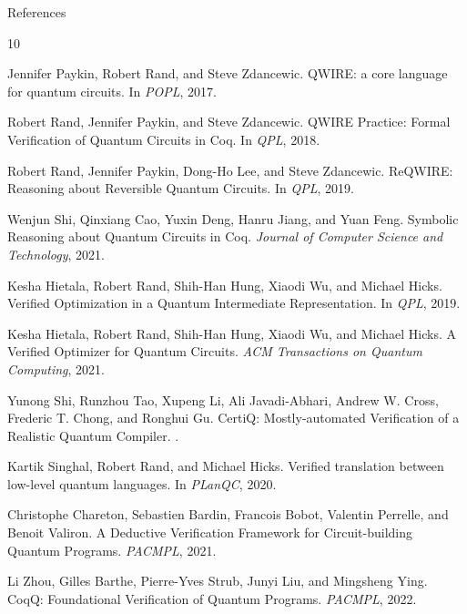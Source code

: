 \documentclass[aspectratio=169]{beamer}
\begin{document}
\begin{frame}[allowframebreaks]{References}
\footnotesize
\begin{thebibliography}{10}

Jennifer Paykin, Robert Rand, and Steve Zdancewic.
\newblock QWIRE: a core language for quantum circuits.
\newblock In \emph{POPL}, 2017.

Robert Rand, Jennifer Paykin, and Steve Zdancewic.
\newblock QWIRE Practice: Formal Verification of Quantum Circuits in Coq.
\newblock In \emph{QPL}, 2018.

Robert Rand, Jennifer Paykin, Dong-Ho Lee, and Steve Zdancewic.
\newblock ReQWIRE: Reasoning about Reversible Quantum Circuits.
\newblock In \emph{QPL}, 2019.

Wenjun Shi, Qinxiang Cao, Yuxin Deng, Hanru Jiang, and Yuan Feng.
\newblock Symbolic Reasoning about Quantum Circuits in Coq.
\newblock \emph{Journal of Computer Science and Technology}, 2021.

Kesha Hietala, Robert Rand, Shih-Han Hung, Xiaodi Wu, and Michael Hicks.
\newblock Verified Optimization in a Quantum Intermediate Representation.
\newblock In \emph{QPL}, 2019.

Kesha Hietala, Robert Rand, Shih-Han Hung, Xiaodi Wu, and Michael Hicks.
\newblock A Verified Optimizer for Quantum Circuits.
\newblock \emph{ACM Transactions on Quantum Computing}, 2021.

Yunong Shi, Runzhou Tao, Xupeng Li, Ali Javadi-Abhari, Andrew W. Cross, Frederic T. Chong, and Ronghui Gu.
\newblock CertiQ: Mostly-automated Verification of a Realistic Quantum Compiler.
.

Kartik Singhal, Robert Rand, and Michael Hicks.
\newblock Verified translation between low-level quantum languages.
\newblock In \emph{PLanQC}, 2020.

Christophe Chareton, Sebastien Bardin, Francois Bobot, Valentin Perrelle, and Benoit Valiron.
\newblock A Deductive Verification Framework for Circuit-building Quantum Programs.
\newblock \emph{PACMPL}, 2021.

Li Zhou, Gilles Barthe, Pierre-Yves Strub, Junyi Liu, and Mingsheng Ying.
\newblock CoqQ: Foundational Verification of Quantum Programs.
\newblock \emph{PACMPL}, 2022.

\end{thebibliography}
\end{frame}
\end{document}
